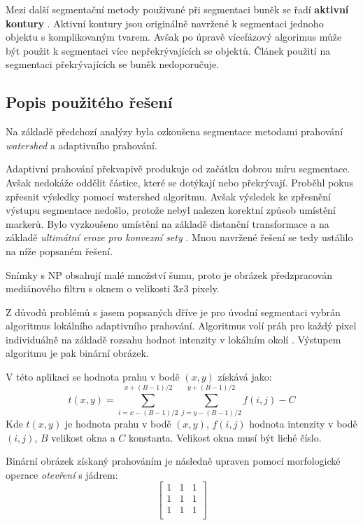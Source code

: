 \documentclass[11pt,twoside,a4paper,table]{book}
\begin{document}
Mezi další segmentační metody použivané při segmentaci buněk se řadí \textbf{aktivní kontury} \cite{art:active_contours1} \cite{art:active_contours2}. Aktivní kontury jsou originálně navržené k segmentaci jednoho objektu s komplikovaným tvarem. Avšak po úpravě vícefázový algorimus může být použit k segmentaci více nepřekrývajících se objektů. Článek \cite{art:ultimate} použití na segmentaci překrývajících se buněk nedoporučuje.

\subsection{Popis použitého řešení}

Na základě předchozí analýzy byla ozkoušena segmentace metodami prahování \textit{watershed} a adaptivního prahování.

Adaptivní prahování překvapivě produkuje od začátku dobrou míru segmentace. Avšak nedokáže oddělit částice, které se dotýkají nebo překrývají. Proběhl pokus zpřesnit výsledky pomocí watershed algoritmu. Avšak výsledek ke zpřesnění výstupu segmentace nedošlo, protože nebyl nalezen korektní způsob umístění markerů. Bylo vyzkoušeno umístění na základě distanční transformace \cite{opencv:watertut} a na základě \textit{ultimátní eroze pro konvexní sety } \cite{art:ultimate}. Mnou navržené řešení se tedy ustálilo na níže popsaném řešení.

Snímky s NP obsahují malé množství šumu, proto je obrázek předzpracován mediánového filtru s oknem o velikosti $3x3$ pixely. 

Z důvodů problémů s jasem popsaných dříve je pro úvodní segmentaci vybrán algoritmus lokálního adaptivního prahování. Algoritmus volí práh pro každý pixel individuálně na základě rozsahu hodnot intenzity v lokálním okolí \cite{on:adaptive}. Výstupem algoritmu je pak binární obrázek.

V této aplikaci se hodnota prahu v bodě $(x,y)$ získává jako:
\begin{equation}
t(x,y) = \sum_{i=x-(B-1)/2}^{x+(B-1)/2} \sum_{j=y-(B-1)/2}^{y+(B-1)/2}f(i,j) - C
\end{equation}
Kde $t(x,y)$ je hodnota prahu v bodě $(x,y)$, $f(i,j)$ hodnota intenzity v bodě $(i,j)$, $B$ velikost okna a $C$ konstanta. Velikost okna musí být liché číslo.

Binární obrázek získaný prahováním je následně upraven pomocí morfologické operace \textit{otevření} s jádrem:
\begin{equation}
\begin{bmatrix}
1 & 1 & 1 \\
1 & 1 & 1 \\
1 & 1 & 1 \\
\end{bmatrix}
\end{equation}
\end{document}
